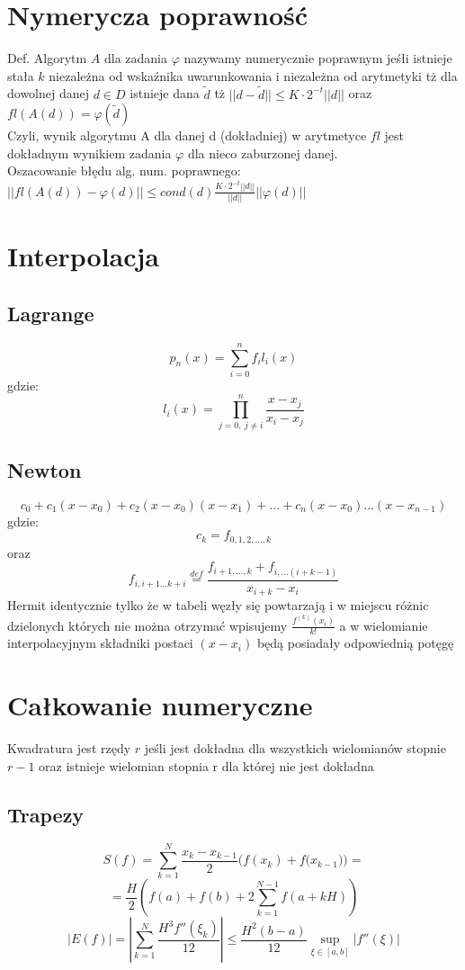 \documentclass[10pt,twocolumn]{article}
\begin{document}
\begin{flushleft}
\section{Nymerycza poprawność}
Def. Algorytm $A$ dla zadania $\varphi$ nazywamy numerycznie poprawnym jeśłi istnieje stała $k$ niezależna od wskaźnika uwarunkowania i niezależna od arytmetyki tż dla dowolnej danej $d \in D$ istnieje dana $\widetilde{d}$ tż $||d-\widetilde{d}|| \leq K\cdot 2^{-t}||d||$ oraz $fl(A(d)) = \varphi(\widetilde{d})$\\
Czyli, wynik algorytmu A dla danej d (dokładniej) w arytmetyce $fl$ jest dokładnym wynikiem zadania $\varphi$ dla nieco zaburzonej danej.\\
Oszacowanie błędu alg. num. poprawnego:\\
$||fl(A(d)) - \varphi(d)|| \leq cond(d) \frac{K\cdot2^{-t}||d||}{||d||}||\varphi(d)||$

\section{Interpolacja}
\subsection{Lagrange}
$$p_{n}(x) = \sum_{i = 0}^{n}f_{i}l_{i}(x)$$
gdzie: $$l_i(x) = \prod_{{j = 0},\ {j \neq i}}^{n} \frac{x - x_{j}}{x_{i}-x_{j}}$$
\subsection{Newton}
$$c_{0} + c_{1}(x-x_{0}) + c_{2}(x-x_{0})(x-x_{1}) + ... + c_{n}(x-x_{0})...(x-x_{n-1})$$
gdzie: $$c_{k} = f_{0,1,2,...,k}$$ oraz $$f_{i,i+1...k+i} \stackrel{def}{=} \frac{f_{i+1,...,k} + f_{i,...(i+k-1)}}{x_{i+k}-x_{i}}$$
Hermit identycznie tylko że w tabeli węzły się powtarzają i w miejscu różnic dzielonych których nie można otrzymać wpisujemy $\frac{f^{(k)}(x_i)}{k!}$ a w wielomianie interpolacyjnym składniki postaci $(x-x_i)$ będą posiadały odpowiednią potęgę

\section{Całkowanie numeryczne}
Kwadratura jest rzędy $r$ jeśli jest dokładna dla wszystkich wielomianów stopnie $r-1$ oraz istnieje wielomian stopnia r dla której nie jest dokładna\\
\subsection{Trapezy}
$$S(f) = \sum_{k=1}^{N} \frac{x_k-x_{k-1}}{2}{(f(x_k)+f(x_{k-1}})) =$$ $$=\frac{H}{2} \left(f(a)+f(b)+2\sum_{k=1}^{N-1}f(a+kH)\right)$$
$$|E(f)| = \left| \sum_{k=1}^{N}\frac{H^3f''(\xi_k)}{12} \right| \leq \frac{H^2(b-a)}{12}\underset{\xi \in [a,b]}{\sup}|f''(\xi)|$$

\end{flushleft}
\end{document}
